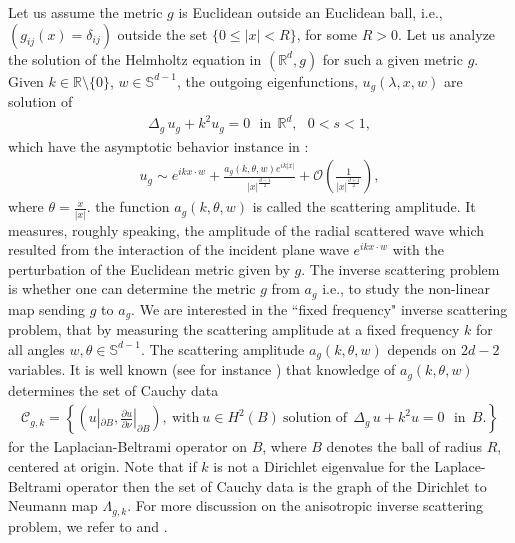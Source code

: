 \documentclass[12pt]{amsart}
\numberwithin{equation}{section}
\theoremstyle{definition}
\theoremstyle{remark}
\numberwithin{equation}{section}
\newcommand{\R}{{\mathbb R}}
\begin{document}
	Let us assume the metric $g$ is Euclidean outside an Euclidean ball, i.e., $(g_{ij}(x)=\delta_{ij})$ outside the set $\{0\leq |x|< R\}$, for some $R>0$. Let us analyze the solution of the Helmholtz equation in $(\mathbb{R}^d,g)$ for such a given metric $g$. Given $k\in\R\setminus\{0\}$, $w\in\mathbb{S}^{d-1}$, the outgoing eigenfunctions, $u_g(\lambda,x,w)$ are solution of
	\begin{align}\label{local helmoholtz eq}
		\Delta_g \,u_g+k^2u_g=0 \ \ \ \mbox{in}\ \ \R^d, \ \ \ 0<s<1,
	\end{align}
	which have the asymptotic behavior instance in \cite[Lemma 19.3]{eskin2011lectures}:
	\begin{align}\label{scattering wave amp}
		u_g\sim e^{ikx\cdot w}+\frac{a_g(k,\theta,w)e^{ik|x|}}{|x|^{\frac{d-1}{2}}}+ \mathcal{O}\left( \frac{1}{|x|^{\frac{d+1}{2}}}\right),
	\end{align}
	where $\theta=\frac{x}{|x|}$.
	\medskip
	the function $a_g(k,\theta,w)$ is called the scattering amplitude. It measures, roughly speaking, the amplitude of the radial scattered wave which resulted from the interaction of the incident plane wave $e^{ikx\cdot w}$ with the perturbation of the Euclidean metric given by $g$. The inverse scattering problem is whether one can determine the metric $g$ from $a_g$ i.e., to study the non-linear map sending $g$ to $a_g$.
	\medskip
	We are interested in the ``fixed frequency" inverse scattering problem, that by measuring the scattering amplitude at a fixed frequency $k$ for all angles $w,\theta\in\mathbb{S}^{d-1}$. The scattering amplitude $a_g(k,\theta,w)$ depends on $2d-2$ variables. It is well known (see for instance \cite{uhlmann1992inverse}) that knowledge of $a_g(k,\theta,w)$ determines the set of Cauchy data
	\begin{align}\label{cauchy data}
		\mathcal{C}_{g,k}=\left\{ \left(u|_{\partial B}, \frac{\partial u}{\partial \nu}|_{\partial B}\right), \ \text{with}\ u\in H^2(B) \ \text{solution of}\ \ \Delta_g \,u+k^2u=0 \ \ \ \mbox{in}\ \ B.\right\}
	\end{align}
	for the Laplacian-Beltrami operator on $B$, where $B$ denotes the ball of radius $R$, centered at origin.
	\medskip
	Note that if $k$ is not a Dirichlet eigenvalue for the Laplace-Beltrami operator then the set of Cauchy data is the graph of the Dirichlet to Neumann map $\Lambda_{g,k}$. For more discussion on the anisotropic inverse scattering problem, we refer to \cite{uhlmann1992inverse} and \cite{isozaki2014recent}.
	
\end{document}

